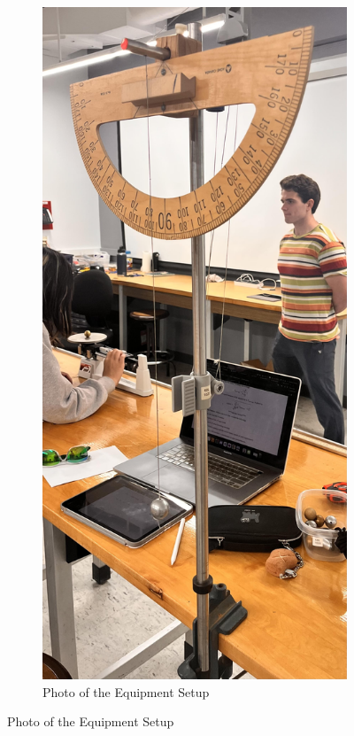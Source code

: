 \documentclass{article}
\begin{document}
\begin{figure}[h!]
\begin{subfigure}[t]{0.2\textwidth}
        \includegraphics[width=\linewidth]{lab_setup.jpg}
        \caption{Photo of the Equipment Setup}
        \label{fig:physical_setup}
    \end{subfigure}
\end{figure}
\end{document}
